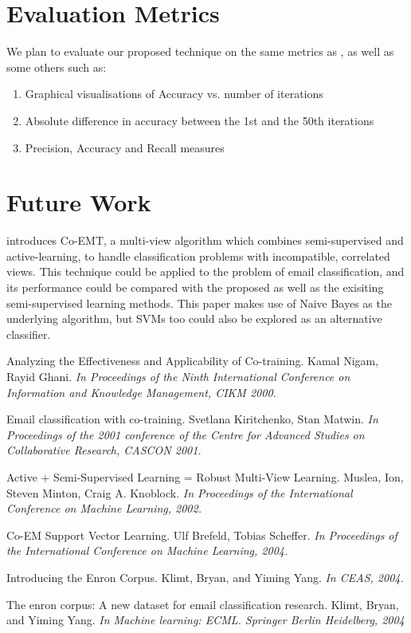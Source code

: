 \section{Evaluation Metrics}

We plan to evaluate our proposed technique on the same metrics as \cite{duck}, as well as some others such as:

\begin{enumerate}
\item 
    Graphical visualisations of Accuracy vs. number of iterations
\item
    Absolute difference in accuracy between the 1st and the 50th iterations
\item
    Precision, Accuracy and Recall measures
\end{enumerate}

\section{Future Work}
\cite{dunno} introduces Co-EMT, a multi-view algorithm which combines semi-supervised and active-learning, to handle classification problems with incompatible, correlated views. This technique could be applied to the problem of email classification, and its performance could be compared with the proposed as well as the exisiting semi-supervised learning methods. This paper makes use of Naive Bayes as the underlying algorithm, but SVMs too could also be explored as an alternative classifier.

\begin{thebibliography}{2}
 Analyzing the Effectiveness and Applicability
    of Co-training. Kamal Nigam, Rayid Ghani. \textit{In Proceedings of the Ninth International Conference on Information and Knowledge Management, CIKM 2000.}

 Email classification with co-training. Svetlana Kiritchenko, Stan Matwin. \textit{In Proceedings of the 2001 conference of the Centre for Advanced Studies on Collaborative Research, CASCON 2001.}

 Active + Semi-Supervised Learning = Robust Multi-View Learning. Muslea, Ion, Steven Minton, Craig A. Knoblock. \textit{In Proceedings of the International Conference on Machine Learning, 2002.}

 Co-EM Support Vector Learning. Ulf Brefeld, Tobias Scheffer. \textit{In Proceedings of the International Conference on Machine Learning, 2004.}

 Introducing the Enron Corpus. Klimt, Bryan, and Yiming Yang. \textit{In CEAS, 2004.}

 The enron corpus: A new dataset for email classification research. Klimt, Bryan, and Yiming Yang. \textit{In Machine learning: ECML. Springer Berlin Heidelberg, 2004}
\end{thebibliography}


